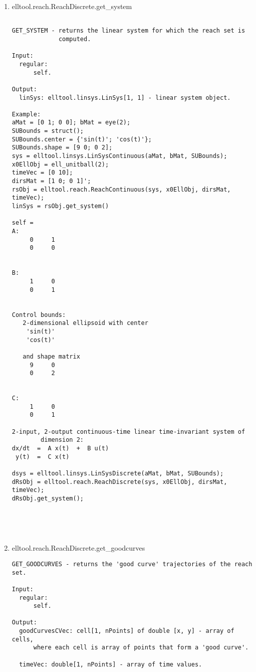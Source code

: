 \begin{enumerate}
\begin{lstlisting}
\end{lstlisting}
\fontfamily{\familydefault}
\selectfont
\item {elltool.reach.ReachDiscrete.get\_system}
\selectfont
\begin{lstlisting}

GET_SYSTEM - returns the linear system for which the reach set is
             computed.

Input:
  regular:
      self.

Output:
  linSys: elltool.linsys.LinSys[1, 1] - linear system object.

Example:
aMat = [0 1; 0 0]; bMat = eye(2);
SUBounds = struct();
SUBounds.center = {'sin(t)'; 'cos(t)'};
SUBounds.shape = [9 0; 0 2];
sys = elltool.linsys.LinSysContinuous(aMat, bMat, SUBounds);
x0EllObj = ell_unitball(2);
timeVec = [0 10];
dirsMat = [1 0; 0 1]';
rsObj = elltool.reach.ReachContinuous(sys, x0EllObj, dirsMat, timeVec);
linSys = rsObj.get_system()

self =
A:
     0     1
     0     0


B:
     1     0
     0     1


Control bounds:
   2-dimensional ellipsoid with center
    'sin(t)'
    'cos(t)'

   and shape matrix
     9     0
     0     2


C:
     1     0
     0     1

2-input, 2-output continuous-time linear time-invariant system of
        dimension 2:
dx/dt  =  A x(t)  +  B u(t)
 y(t)  =  C x(t)

dsys = elltool.linsys.LinSysDiscrete(aMat, bMat, SUBounds);
dRsObj = elltool.reach.ReachDiscrete(sys, x0EllObj, dirsMat, timeVec);
dRsObj.get_system();





\end{lstlisting}
\fontfamily{\familydefault}
\selectfont
\item {elltool.reach.ReachDiscrete.get\_goodcurves}
\selectfont
\begin{lstlisting}
GET_GOODCURVES - returns the 'good curve' trajectories of the reach set.

Input:
  regular:
      self.

Output:
  goodCurvesCVec: cell[1, nPoints] of double [x, y] - array of cells,
      where each cell is array of points that form a 'good curve'.

  timeVec: double[1, nPoints] - array of time values.


\end{lstlisting}
\end{enumerate}
